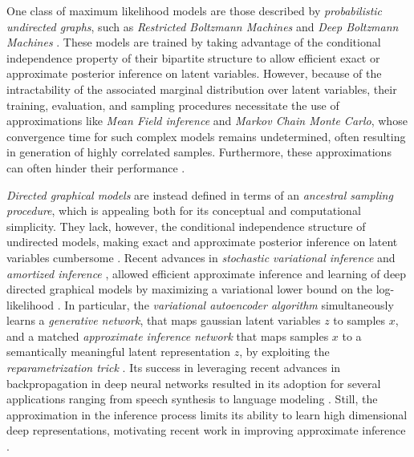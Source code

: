 \documentclass{article}
\newcommand{\jcom}[1]{\textcolor{darkgreen}{[jascha: #1]}}
\newcommand{\ldcom}[1]{\textcolor{blue}{[laurent: #1]}}
\begin{document}
One class of maximum likelihood models are those described by \emph{probabilistic undirected graphs}, such as \emph{Restricted Boltzmann Machines} \citep{smolensky1986information} and \emph{Deep Boltzmann Machines} \citep{salakhutdinov2009deep}. These models are trained by taking advantage of the conditional independence property of their bipartite structure to allow efficient exact or approximate posterior inference on latent variables. However, because of the intractability of the associated marginal distribution over latent variables, their training, evaluation, and sampling procedures necessitate the use of approximations like \emph{Mean Field inference} and \emph{Markov Chain Monte Carlo}, whose convergence time for such complex models remains undetermined, often resulting in generation of highly correlated samples. Furthermore, these approximations can often hinder their performance \citep{berglund2013stochastic}. %

\emph{Directed graphical models} are instead defined in terms of an \emph{ancestral sampling procedure}, which is appealing both for its conceptual and computational simplicity. They lack, however, the conditional independence structure of undirected models, making exact and approximate posterior inference on latent variables cumbersome \citep{saul1996mean}. Recent advances in \emph{stochastic variational inference} \citep{hoffman2013stochastic} and \emph{amortized inference} \citep{dayan1995helmholtz, mnih2014neural, kingma2013auto, rezende2014stochastic}, allowed efficient approximate inference and learning of deep directed graphical models by maximizing a variational lower bound on the log-likelihood \citep{neal1998view}. In particular, the \emph{variational autoencoder algorithm} \citep{kingma2013auto, rezende2014stochastic} simultaneously learns a \emph{generative network}, that maps gaussian latent variables $z$ to samples $x$, and a matched \emph{approximate inference network} that maps samples $x$ to a semantically meaningful latent representation $z$, by exploiting the \emph{reparametrization trick} \citep{williams1992simple}.
Its success in leveraging recent advances in backpropagation \citep{rumelhart1988learning, lecun2012efficient} in deep neural networks resulted in its adoption for several applications ranging from speech synthesis \citep{chung2015recurrent} to language modeling \citep{bowman2015generating}. Still, the approximation in the inference process limits its ability to learn high dimensional deep representations, motivating recent work in improving approximate inference \citep{maaloe2016auxiliary, rezende2015variational, salimans2014markov, tran2015variational, burda2015importance,  DBLP:conf/icml/Sohl-DicksteinW15, kingma2016improving}.
\end{document}
